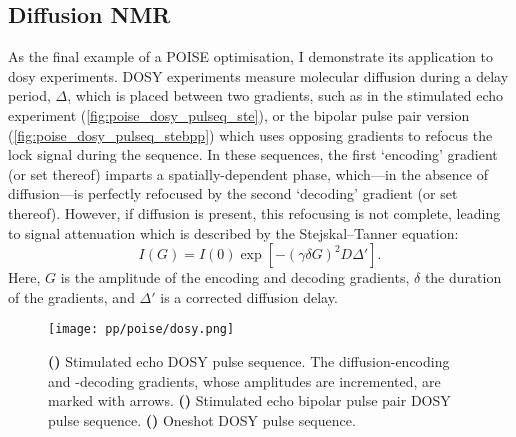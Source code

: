 \subsection{Diffusion NMR}
\label{subsec:poise__diffusion}

As the final example of a POISE optimisation, I demonstrate its application to \acf{dosy} experiments.\autocite{Johnson1999PNMRS}
DOSY experiments measure molecular diffusion during a delay period, $\Delta$, which is placed between two gradients, such as in the stimulated echo experiment (\cref{fig:poise_dosy_pulseq_ste}), or the bipolar pulse pair version (\cref{fig:poise_dosy_pulseq_stebpp}) which uses opposing gradients to refocus the lock signal during the sequence.
In these sequences, the first `encoding' gradient (or set thereof) imparts a spatially-dependent phase, which---in the absence of diffusion---is perfectly refocused by the second `decoding' gradient (or set thereof).
However, if diffusion is present, this refocusing is not complete, leading to signal attenuation which is described by the Stejskal--Tanner equation:
\begin{equation}
    \label{eq:stejskal_tanner_again}
    I(G) = I(0) \exp\left[-(\gamma\delta G)^2 D \Delta'\right].
\end{equation}
Here, $G$ is the amplitude of the encoding and decoding gradients, $\delta$ the duration of the gradients, and $\Delta'$ is a corrected diffusion delay.

\begin{figure}[htb]
    \centering
    \texttt{[image: pp/poise/dosy.png]}
    {\label{fig:poise_dosy_pulseq_ste}}
    {\label{fig:poise_dosy_pulseq_stebpp}}
    {\label{fig:poise_dosy_pulseq_oneshot}}
    \caption[Selection of DOSY pulse sequences]{
        \textbf{()} Stimulated echo DOSY pulse sequence. The diffusion-encoding and -decoding gradients, whose amplitudes are incremented, are marked with arrows.
        \textbf{()} Stimulated echo bipolar pulse pair DOSY pulse sequence.
        \textbf{()} Oneshot DOSY pulse sequence.
    }
    \label{fig:poise_dosy_pulseq}
\end{figure}

